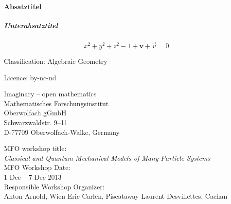 \paragraph{Absatztitel}\blindtext[1]
\subparagraph{Unterabsatztitel}\blindtext[1]
\begin{equation}
x^2+y^2+z^2-1+\mathbf{v}+\vec{v}=0
\end{equation}
\blindtext

\null\vfill
\noindent\begin{minipage}[b]{0.5\linewidth}
\raggedright
\arial
{}\lsstyle
\footnotesize
Classification: Algebraic Geometry

Licence: by-nc-nd
\bigskip

Imaginary -- open mathematics\\
Mathematisches Forschungsinstitut\\
Oberwolfach gGmbH\\
Schwarzwaldstr. 9--11\\
D-77709 Oberwolfach-Walke, Germany
\end{minipage}%
\hspace{1ex}
\begin{minipage}[b]{0.45\linewidth}%
\raggedright
\arial
{}\lsstyle
\footnotesize
MFO workshop title:\\
\textit{Classical and Quantum Mechanical Models of Many-Particle Systems}
\\[\medskipamount]

MFO Workshop Date:\\
1 Dec -- 7 Dec 2013
\\[\medskipamount]

Responsible Workshop Organizer:\\
Anton Arnold, Wien
Eric Carlen, Piscataway
Laurent Desvillettes, Cachan
\end{minipage}

%
